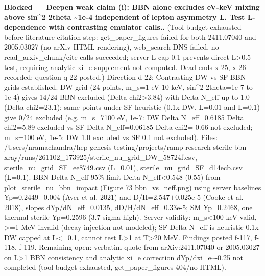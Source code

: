 \documentclass[11pt,a4paper]{article}
\begin{document}
\textbf{Blocked --- Deepen weak claim (i): BBN alone excludes eV-keV mixing above sin\textasciicircum{}2 2theta \textasciitilde{}1e-4 independent of lepton asymmetry L. Test L-dependence with contrasting emulator calls..} (Tool budget exhausted before literature citation step: get\_paper\_figures failed for both 2411.07040 and 2005.03027 (no arXiv HTML rendering), web\_search DNS failed, no read\_arxiv\_chunk/cite calls succeeded; server L cap 0.1 prevents direct L\textgreater{}0.5 test, requiring analytic xi\_e supplement not computed. Dead ends x-25, x-26 recorded; question q-22 posted.) Direction d-22: Contrasting DW vs SF BBN grids established. DW grid (24 points, m\_s=1 eV-10 keV, sin\textasciicircum{}2 2theta=1e-7 to 1e-4) gives 14/24 BBN-excluded (Delta chi2\textgreater{}3.84) with Delta N\_eff up to 1.0 (Delta chi2=23.1); same points under SF heuristic (0.1x DW, L=0.01 and L=0.1) give 0/24 excluded (e.g. m\_s=7100 eV, 1e-7: DW Delta N\_eff=0.6185 Delta chi2=5.89 excluded vs SF Delta N\_eff=0.06185 Delta chi2=-0.66 not excluded; m\_s=100 eV, 1e-5: DW 1.0 excluded vs SF 0.1 not excluded). Files: /Users/nramachandra/hep-genesis-testing/projects/ramp-research-sterile-bbn-xray/runs/261102\_173925/sterile\_nu\_grid\_DW\_58724f.csv, sterile\_nu\_grid\_SF\_ee8749.csv (L=0.01), sterile\_nu\_grid\_SF\_d14ecb.csv (L=0.1). BBN Delta N\_eff 95\% limit Delta N\_eff\textless{}0.548 (0.55) from plot\_sterile\_nu\_bbn\_impact (Figure 73 bbn\_vs\_neff.png) using server baselines Yp=0.2449$\pm$0.004 (Aver et al. 2021) and D/H=2.547$\pm$0.025e-5 (Cooke et al. 2018), slopes dYp/dN\_eff=0.0135, dD/H/dN\_eff=0.33e-5; SM Yp=0.2468, one thermal sterile Yp=0.2596 (3.7 sigma high). Server validity: m\_s\textless{}100 keV valid, \textgreater{}=1 MeV invalid (decay injection not modeled); SF Delta N\_eff is heuristic 0.1x DW capped at L\textless{}=0.1, cannot test L\textgreater{}1 at T\textgreater{}20 MeV. Findings posted f-117, f-118, f-119. Remaining open: verbatim quote from arXiv:2411.07040 or 2005.03027 on L\textgreater{}1 BBN consistency and analytic xi\_e correction dYp/dxi\_e\textasciitilde{}-0.25 not completed (tool budget exhausted, get\_paper\_figures 404/no HTML).
\end{document}
